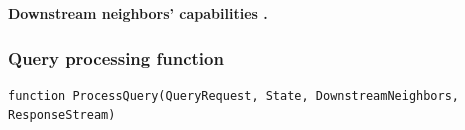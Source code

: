 \medskip
\noindent
\textbf{Downstream neighbors' capabilities .}

\subsubsection{Query processing function}



\begin{lstlisting}[caption={Query processing function signature},captionpos=b,label={lst:query_processing_func}]
function ProcessQuery(QueryRequest, State, DownstreamNeighbors, ResponseStream)
\end{lstlisting}

